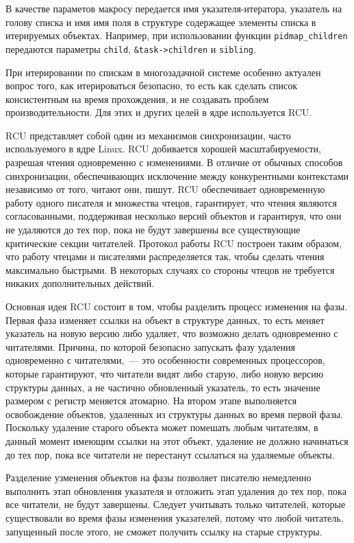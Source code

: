 В качестве параметов макросу передается имя указателя-итератора, указатель на
голову списка и имя имя поля в структуре содержащее элементы списка в
итерируемых объектах. Например, при использовании функции
\texttt{pidmap\_children} передаются параметры \texttt{child},
\texttt{\&task->children} и \texttt{sibling}.

При итерировании по спискам в многозадачной системе особенно актуален вопрос
того, как итерироваться безопасно, то есть как сделать список консистентным на
время прохождения, и не создавать проблем производительности. Для этих и других
целей в ядре используется RCU.

RCU представляет собой один из механизмов синхронизации, часто используемого в
ядре Linux. RCU добивается хорошей масштабируемости, разрешая чтения
одновременно
с изменениями. В отличие от обычных способов синхронизации, обеспечивающих
исключение между конкурентными контекстами независимо от того, читают они,
пишут. RCU обеспечивает одновременную работу одного писателя и множества чтецов,
гарантирует, что чтения являются согласованными, поддерживая несколько версий
объектов и гарантируя, что они не удаляются до тех пор, пока не будут завершены
все существующие критические секции читателей. Протокол работы RCU построен
таким образом, что работу чтецами и писателями распределяется так, чтобы сделать
чтения максимально быстрыми. В некоторых случаях со стороны чтецов не требуется
никаких дополнительных действий.

Основная идея RCU состоит в том, чтобы разделить процесс изменения на фазы.
Первая фаза изменяет ссылки на объект в структуре данных, то есть меняет
указатель на новую версию либо удаляет, что возможно делать одновременно с
читателями. Причина, по которой безопасно запускать фазу удаления одновременно с
читателями,~--- это особенности современных процессоров, которые гарантируют,
что читатели видят либо старую, либо новую версию структуры данных, а не
частично обновленный указатель, то есть значение размером с регистр меняется
атомарно. На втором этапе выполняется освобождение объектов, удаленных из
структуры данных во время первой фазы. Поскольку удаление старого объекта может
помешать любым читателям, в данный момент имеющим ссылки на этот объект,
удаление не должно начинаться до тех пор, пока все читатели не перестанут
ссылаться на удаляемые объекты.

Разделение узменения объектов на фазы позволяет писателю немедленно выполнить
этап обновления указателя и отложить этап удаления до тех пор, пока все
читатели, не будут завершены. Следует учитывать только читателей, которые
существовали во время фазы изменения указателей, потому что любой читатель,
запущенный после этого, не сможет получить ссылку на старые структуры.

